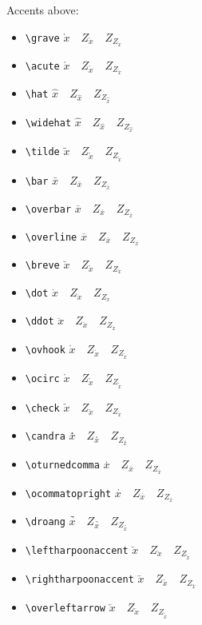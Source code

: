 Accents above:
\begin{itemize}
\item \verb+\grave+ $\grave x\quad Z_{\grave x}\quad Z_{Z_{\grave x}}$
\item \verb+\acute+ $\acute x\quad Z_{\acute x}\quad Z_{Z_{\acute x}}$
\item \verb+\hat+ $\hat x\quad Z_{\hat x}\quad Z_{Z_{\hat x}}$
\item \verb+\widehat+ $\widehat x\quad Z_{\widehat x}\quad Z_{Z_{\widehat x}}$
\item \verb+\tilde+ $\tilde x\quad Z_{\tilde x}\quad Z_{Z_{\tilde x}}$
\item \verb+\bar+ $\bar x\quad Z_{\bar x}\quad Z_{Z_{\bar x}}$
\item \verb+\overbar+ $\overbar x\quad Z_{\overbar x}\quad Z_{Z_{\overbar x}}$
\item \verb+\overline+ $\overline x\quad Z_{\overline x}\quad Z_{Z_{\overline x}}$
\item \verb+\breve+ $\breve x\quad Z_{\breve x}\quad Z_{Z_{\breve x}}$
\item \verb+\dot+ $\dot x\quad Z_{\dot x}\quad Z_{Z_{\dot x}}$
\item \verb+\ddot+ $\ddot x\quad Z_{\ddot x}\quad Z_{Z_{\ddot x}}$
\item \verb+\ovhook+ $\ovhook x\quad Z_{\ovhook x}\quad Z_{Z_{\ovhook x}}$
\item \verb+\ocirc+ $\ocirc x\quad Z_{\ocirc x}\quad Z_{Z_{\ocirc x}}$
\item \verb+\check+ $\check x\quad Z_{\check x}\quad Z_{Z_{\check x}}$
\item \verb+\candra+ $\candra x\quad Z_{\candra x}\quad Z_{Z_{\candra x}}$
\item \verb+\oturnedcomma+ $\oturnedcomma x\quad Z_{\oturnedcomma x}\quad Z_{Z_{\oturnedcomma x}}$
\item \verb+\ocommatopright+ $\ocommatopright x\quad Z_{\ocommatopright x}\quad Z_{Z_{\ocommatopright x}}$
\item \verb+\droang+ $\droang x\quad Z_{\droang x}\quad Z_{Z_{\droang x}}$
\item \verb+\leftharpoonaccent+ $\leftharpoonaccent x\quad Z_{\leftharpoonaccent x}\quad Z_{Z_{\leftharpoonaccent x}}$
\item \verb+\rightharpoonaccent+ $\rightharpoonaccent x\quad Z_{\rightharpoonaccent x}\quad Z_{Z_{\rightharpoonaccent x}}$
\item \verb+\overleftarrow+ $\overleftarrow x\quad Z_{\overleftarrow x}\quad Z_{Z_{\overleftarrow x}}$

\end{itemize}
